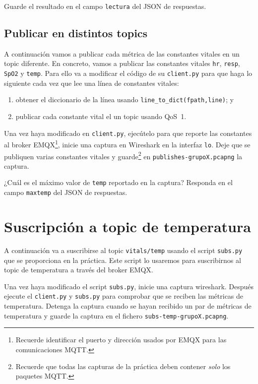 \documentclass{upmassignment}
\begin{document}
\begin{problemlist}
    \pbitem Guarde el resultado en el campo
        \texttt{lectura} del JSON
        de respuestas.
\end{problemlist}


\subsection*{Publicar en distintos topics}
A continuación vamos a publicar cada
métrica de las constantes vitales en un
topic diferente. En concreto, vamos a publicar
las constantes vitales
\texttt{hr},
\texttt{resp},
\texttt{SpO2} y
\texttt{temp}.
Para ello va a modificar el código de su
\texttt{client.py} para que haga lo siguiente
cada vez que lee una línea de constantes
vitales:
\begin{enumerate}
    \item obtener el diccionario de la línea
        usando
        \texttt{line\_to\_dict(fpath,line)}; y
    \item publicar cada constante vital
        el un topic usando QoS~1.
\end{enumerate}


Una vez haya modificado en \texttt{client.py},
ejecútelo para que reporte las constantes
al broker EMQX\footnote{Recuerde identificar
el puerto y dirección usados por EMQX para
las comunicaciones MQTT.}, inicie una
captura en Wireshark en la interfaz
\texttt{lo}. Deje que se publiquen
varias constantes vitales y guarde\footnote{
Recuerde que todas las capturas
de la práctica deben contener
\emph{solo} los paquetes MQTT.
}
en \texttt{publishes-grupoX.pcapng}
la captura.

\begin{problemlist}
    \pbitem ¿Cuál es el máximo valor
        de \texttt{temp} reportado en la
        captura? Responda en el campo
        \texttt{maxtemp} del JSON de respuestas.
\end{problemlist}



\section*{Suscripción a topic de temperatura}
A continuación va a suscribirse al
topic \texttt{vitals/temp} usando el
script \texttt{subs.py} que se proporciona
en la práctica. Este script lo usaremos
para suscribirnos al topic de temperatura
a través del broker EMQX.

Una vez haya modificado el script
\texttt{subs.py}, inicie una captura
wireshark. Después ejecute
el \texttt{client.py} y \texttt{subs.py}
para comprobar que se reciben las métricas
de temperatura. 
Detenga la captura cuando se hayan
recibido un par de métricas de temperatura
y guarde la captura en el
fichero \texttt{subs-temp-grupoX.pcapng}.
\end{document}
